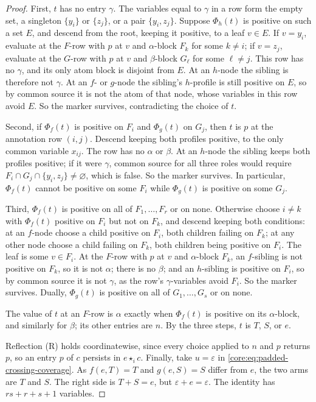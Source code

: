 \begin{proof}
First, $t$ has no entry $\gamma$. The variables equal to $\gamma$ in a row
form the empty set, a singleton $\{y_i\}$ or $\{z_j\}$, or a pair
$\{y_i,z_j\}$. Suppose $\Phi_h(t)$ is positive on such a set $E$, and
descend from the root, keeping it positive, to a leaf $v\in E$. If
$v=y_i$, evaluate at the $F$-row with $p$ at $v$ and $\alpha$-block $F_k$
for some $k\ne i$; if $v=z_j$, evaluate at the $G$-row with $p$ at $v$ and
$\beta$-block $G_\ell$ for some $\ell\ne j$. This row has no $\gamma$, and
its only atom block is disjoint from $E$. At an $h$-node the sibling is
therefore not $\gamma$. At an $f$- or $g$-node the sibling's $h$-profile is
still positive on $E$, so by common source it is not the atom of that
node, whose variables in this row avoid $E$. So the marker survives, contradicting the
choice of $t$.

Second, if $\Phi_f(t)$ is positive on $F_i$ and $\Phi_g(t)$ on $G_j$, then
$t$ is $p$ at the annotation row $(i,j)$. Descend keeping both profiles
positive, to the only common variable $x_{ij}$. The row has no $\alpha$ or
$\beta$. At an $h$-node the sibling keeps both profiles positive; if it were
$\gamma$, common source for all three roles would require
$F_i\cap G_j\cap\{y_i,z_j\}\ne\varnothing$, which is false. So the marker
survives. In particular, $\Phi_f(t)$ cannot be positive on some $F_i$ while
$\Phi_g(t)$ is positive on some $G_j$.

Third, $\Phi_f(t)$ is positive on all of $F_1,\ldots,F_r$ or on none.
Otherwise choose $i\ne k$ with $\Phi_f(t)$ positive on $F_i$ but not on
$F_k$, and descend keeping both conditions: at an $f$-node choose a child
positive on $F_i$, both children failing on $F_k$; at any other node choose
a child failing on $F_k$, both children being positive on $F_i$. The leaf
is some $v\in F_i$. At the $F$-row with $p$ at $v$ and $\alpha$-block
$F_k$, an $f$-sibling is not positive on $F_k$, so it is not $\alpha$;
there is no $\beta$; and an $h$-sibling is positive on $F_i$, so by common
source it is not $\gamma$, as the row's $\gamma$-variables avoid $F_i$. So
the marker survives. Dually, $\Phi_g(t)$ is positive on all of
$G_1,\ldots,G_s$ or on none.

The value of $t$ at an $F$-row is $\alpha$ exactly when $\Phi_f(t)$ is
positive on its $\alpha$-block, and similarly for $\beta$; its other
entries are $n$. By the three steps, $t$ is $T$, $S$, or $e$.

Reflection (R) holds coordinatewise, since every choice applied to $n$ and
$p$ returns $p$, so an entry $p$ of $c$ persists in $e\star_ic$. Finally, take $u=\varepsilon$ in
\eqref{core:eq:padded-crossing-coverage}. As $f(e,T)=T$ and $g(e,S)=S$
differ from $e$, the two arms are $T$ and $S$. The right side is $T+S=e$,
but $\varepsilon+e=\varepsilon$. The identity has $rs+r+s+1$ variables.
\end{proof}

